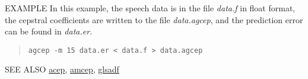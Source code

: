 \begin{options}
\end{options}

\begin{qsection}{EXAMPLE}
        In this example, the speech data is in the file {\em data.f}
        in float format, the cepstral coefficients are written to
        the file {\em data.agcep},
        and the prediction error can be found in {\em data.er}.
\begin{quote}
 \verb!agcep -m 15 data.er < data.f > data.agcep!
\end{quote} 
\end{qsection}

\begin{qsection}{SEE ALSO}
\hyperlink{acep}{acep},
\hyperlink{amcep}{amcep},
\hyperlink{glsadf}{glsadf}
\end{qsection}
